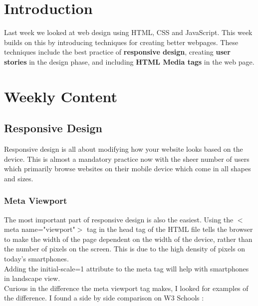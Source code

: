 \documentclass[portfolio.tex.tex]{subfiles}
\begin{document}
		\section{Introduction}
			Last week we looked at web design using HTML, CSS and JavaScript. This week builds on this by introducing techniques for creating better webpages. These techniques include the best practice of \textbf{responsive design}, creating \textbf{user stories} in the design phase, and including \textbf{HTML Media tags} in the web page. \\

		\section{Weekly Content}
			\subsection{Responsive Design}
				Responsive design is all about modifying how your website looks based on the device. This is almost a mandatory practice now with the sheer number of users which primarily browse websites on their mobile device which come in all shapes and sizes. \\

				\subsubsection{Meta Viewport}
					The most important part of responsive design is also the easiest. Using the $<$meta name="viewport"$>$ tag in the head tag of the HTML file tells the browser to make the width of the page dependent on the width of the device, rather than the number of pixels on the screen. This is due to the high density of pixels on today's smartphones. \autocite{google-responsive}\\

					Adding the initial-scale=1 attribute to the meta tag will help with smartphones in landscape view.\autocite{google-responsive}\\

					Curious in the difference the meta viewport tag makes, I looked for examples of the difference. I found a side by side comparison on W3 Schools \autocite{viewport-example}:

					\fboxsep=1mm
					\fboxrule=5pt

					\hspace{-1cm}
\end{document}
